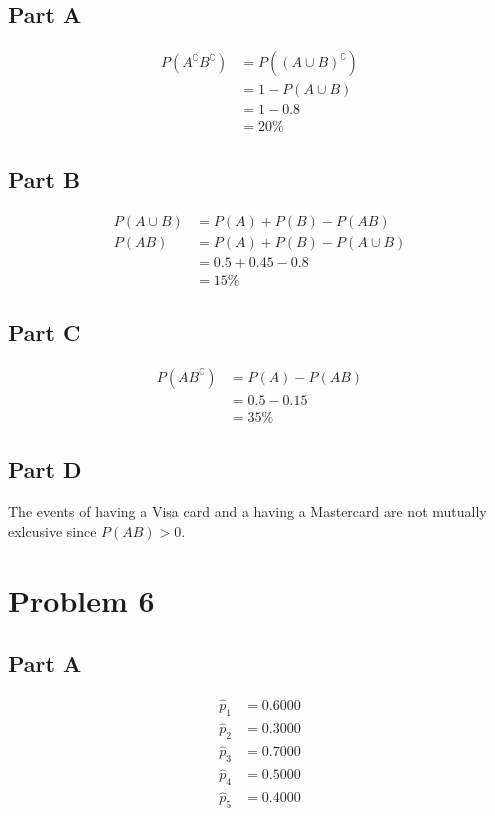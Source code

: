 \documentclass[12pt]{extarticle}
\begin{document}
\subsection*{Part A}
\begin{align*}
	P(A^\complement B^\complement) &= P((A \cup B)^\complement) \\
																			&= 1 - P(A \cup B) \\
																			&= 1 - 0.8 \\
																			&= 20\%
\end{align*}
\subsection*{Part B}
\begin{align*}
	P(A\cup B) &= P(A) + P(B) - P(AB) \\
	P(AB) &= P(A) + P(B) - P(A \cup B) \\
	&= 0.5 + 0.45 - 0.8 \\
	&= 15\%
\end{align*}
\subsection*{Part C}
\begin{align*}
	P(AB^\complement) &= P(A) - P(AB) \\
										&= 0.5 - 0.15 \\
										&= 35\%
\end{align*}
\subsection*{Part D}
The events of having a Visa card and a having a Mastercard are not mutually exlcusive since $P(AB) > 0$.

\section*{Problem 6}
\subsection*{Part A}

\begin{align*}
	\hat{p}_1 &= 0.6000 \\
	\hat{p}_2 &= 0.3000 \\
	\hat{p}_3 &= 0.7000 \\
	\hat{p}_4 &= 0.5000 \\
	\hat{p}_5 &= 0.4000
\end{align*}
\end{document}
